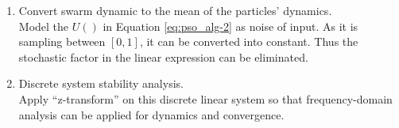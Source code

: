 \documentclass[12pt]{article}
\begin{document}
\begin{enumerate}
\item Convert swarm dynamic to the mean of the particles' dynamics. \\

Model the $ U() $ in Equation \eqref{eq:pso_alg-2} as noise of input. As it is sampling between $ [0, 1] $, it can be converted into constant. Thus the stochastic factor in the linear expression can be eliminated.
 
\item Discrete system stability analysis. \\

Apply ``z-transform'' on this discrete linear system so that frequency-domain analysis can be applied for dynamics and convergence. 



\end{enumerate}





\end{document}
